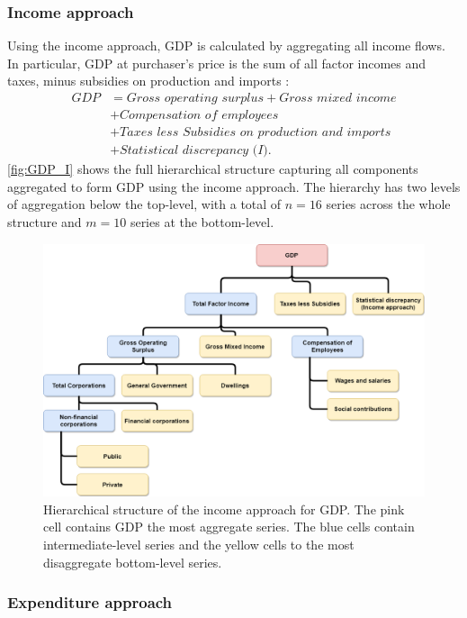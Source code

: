 \documentclass[graybox]{svmult}
\begin{document}
\subsubsection*{Income approach}

Using the income approach, GDP is calculated by aggregating all income flows. In particular, GDP at purchaser's price is the sum of all factor incomes and taxes, minus subsidies on production and imports \citep{ABS2015}:
\begin{align*}
	\textit{GDP}
	  & = \textit{Gross operating surplus}+ \textit{Gross mixed income} \\
	  & + \textit{Compensation of employees} \\
	  & + \textit{Taxes less Subsidies on production and imports} \\
	  & + \textit{Statistical discrepancy (I)}.
\end{align*}
\autoref{fig:GDP_I} shows the full hierarchical structure capturing all components aggregated to form GDP using the income approach. The hierarchy has two levels of aggregation below the top-level, with a total of $n=16$ series across the whole structure and $m=10$ series at the bottom-level.

\begin{figure}[!h]
	\centering
	\includegraphics[width=.9\textwidth]{Figs/IncomeApproach.png}
	\caption{Hierarchical structure of the income approach for GDP. The pink cell contains GDP the most aggregate series. The blue cells contain intermediate-level series and the yellow cells to the most disaggregate bottom-level series.}\label{fig:GDP_I}
\end{figure}

\subsubsection*{Expenditure approach}
\end{document}

